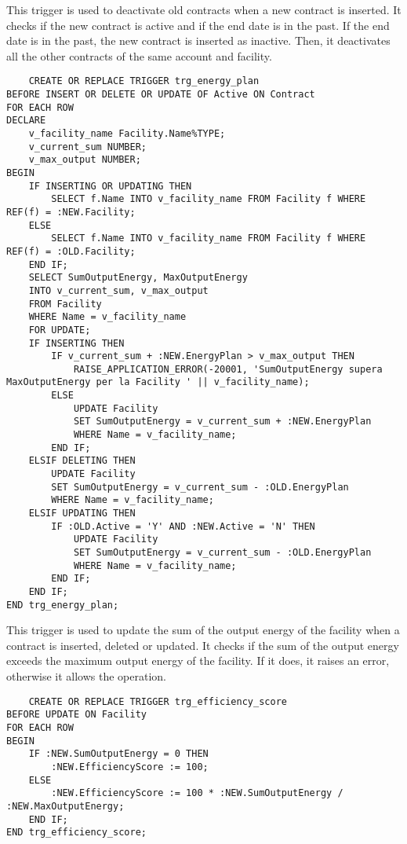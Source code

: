 This trigger is used to deactivate old contracts when a new contract is inserted. It checks if the new contract is active and if the end date is in the past. If the end date is in the past, the new contract is inserted as inactive. Then, it deactivates all the other contracts of the same account and facility.


\begin{lstlisting}
    CREATE OR REPLACE TRIGGER trg_energy_plan
BEFORE INSERT OR DELETE OR UPDATE OF Active ON Contract
FOR EACH ROW
DECLARE
    v_facility_name Facility.Name%TYPE;
    v_current_sum NUMBER;
    v_max_output NUMBER;
BEGIN
    IF INSERTING OR UPDATING THEN
        SELECT f.Name INTO v_facility_name FROM Facility f WHERE REF(f) = :NEW.Facility;
    ELSE
        SELECT f.Name INTO v_facility_name FROM Facility f WHERE REF(f) = :OLD.Facility;
    END IF;
    SELECT SumOutputEnergy, MaxOutputEnergy 
    INTO v_current_sum, v_max_output 
    FROM Facility 
    WHERE Name = v_facility_name 
    FOR UPDATE;
    IF INSERTING THEN
        IF v_current_sum + :NEW.EnergyPlan > v_max_output THEN
            RAISE_APPLICATION_ERROR(-20001, 'SumOutputEnergy supera MaxOutputEnergy per la Facility ' || v_facility_name);
        ELSE
            UPDATE Facility 
            SET SumOutputEnergy = v_current_sum + :NEW.EnergyPlan 
            WHERE Name = v_facility_name;
        END IF;
    ELSIF DELETING THEN
        UPDATE Facility 
        SET SumOutputEnergy = v_current_sum - :OLD.EnergyPlan 
        WHERE Name = v_facility_name;
    ELSIF UPDATING THEN
        IF :OLD.Active = 'Y' AND :NEW.Active = 'N' THEN
            UPDATE Facility 
            SET SumOutputEnergy = v_current_sum - :OLD.EnergyPlan 
            WHERE Name = v_facility_name;
        END IF;
    END IF;
END trg_energy_plan;
\end{lstlisting}

This trigger is used to update the sum of the output energy of the facility when a contract is inserted, deleted or updated. It checks if the sum of the output energy exceeds the maximum output energy of the facility. If it does, it raises an error, otherwise it allows the operation.

\begin{lstlisting}
    CREATE OR REPLACE TRIGGER trg_efficiency_score
BEFORE UPDATE ON Facility
FOR EACH ROW
BEGIN
    IF :NEW.SumOutputEnergy = 0 THEN
        :NEW.EfficiencyScore := 100;
    ELSE
        :NEW.EfficiencyScore := 100 * :NEW.SumOutputEnergy / :NEW.MaxOutputEnergy;
    END IF;
END trg_efficiency_score;
\end{lstlisting}

